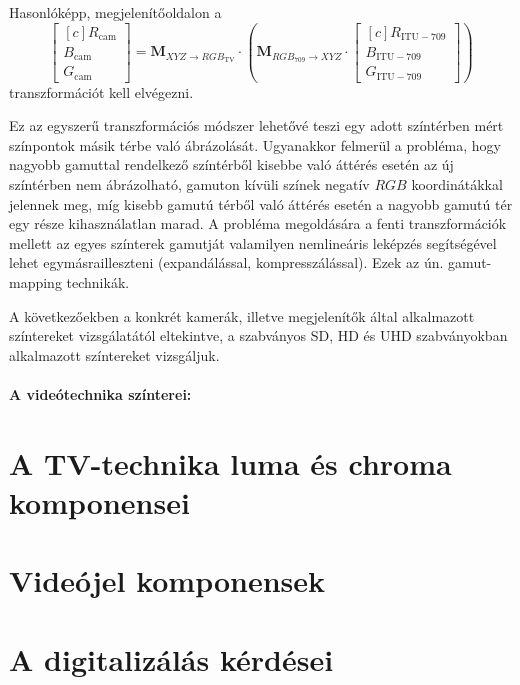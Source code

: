 %
Hasonlóképp, megjelenítőoldalon a
\begin{equation} 
\begin{bmatrix}[c]
       R_{\mathrm{cam}} \\[0.3em]
       B_{\mathrm{cam}} \\[0.3em]
       G_{\mathrm{cam}} \end{bmatrix}
       =
       \mathbf{M}_{ X\!Y\!Z \rightarrow R\!G\!B_{\mathrm{TV}} } \cdot 
\left(     \mathbf{M}_{R\!G\!B_{709}  \rightarrow X\!Y\!Z } \cdot
\begin{bmatrix}[c]
       R_{\mathrm{ITU}-709} \\[0.3em]
       B_{\mathrm{ITU}-709} \\[0.3em]
       G_{\mathrm{ITU}-709} \end{bmatrix}
 \right)
\end{equation}
transzformációt kell elvégezni.

Ez az egyszerű transzformációs módszer lehetővé teszi egy adott színtérben mért színpontok másik térbe való ábrázolását.
Ugyanakkor felmerül a probléma, hogy nagyobb gamuttal rendelkező színtérből kisebbe való áttérés esetén az új színtérben nem ábrázolható, gamuton kívüli színek negatív $RGB$ koordinátákkal jelennek meg, míg kisebb gamutú térből való áttérés esetén a nagyobb gamutú tér egy része kihasználatlan marad.
A probléma megoldására a fenti transzformációk mellett az egyes színterek gamutját valamilyen nemlineáris leképzés segítségével lehet egymásrailleszteni (expandálással, kompresszálással).
Ezek az ún. gamut-mapping technikák.

A következőekben a konkrét kamerák, illetve megjelenítők által alkalmazott színtereket vizsgálatától eltekintve, a szabványos SD, HD és UHD szabványokban alkalmazott színtereket vizsgáljuk.

\paragraph{A videótechnika színterei:\\}


\section{A TV-technika luma és chroma komponensei}

\section{Videójel komponensek}

\section{A digitalizálás kérdései}